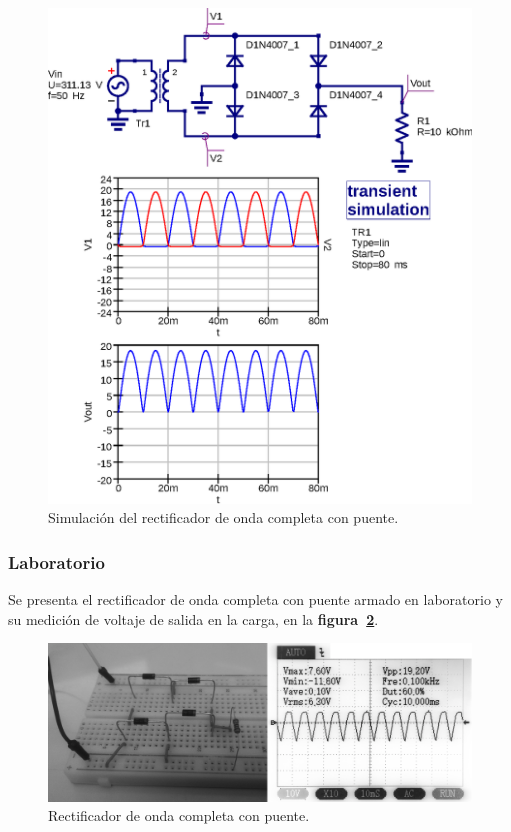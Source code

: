 \begin{figure}[!h]
\centering
\includegraphics[scale=0.75]{simulacion/04.onda_completa1.eps}
\caption{Simulación del rectificador de onda completa con puente.}
\label{simulacion04}
\end{figure}

\subsubsection{Laboratorio}
Se presenta el rectificador de onda completa con puente armado en laboratorio y
su medición de voltaje de salida en la carga, en la
\textbf{figura~\ref{laboratorio06}}.

\begin{figure}[!h]
\centering
\includegraphics[scale=0.28]{fotos/04.onda_completa1.eps}
\caption{Rectificador de onda completa con puente.}
\label{laboratorio06}
\end{figure}

